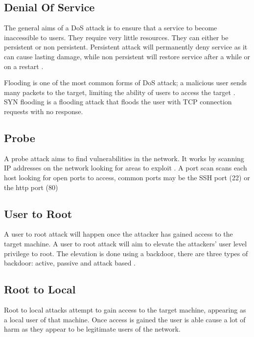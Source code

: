 \subsection{Denial Of Service}
The general aims of a DoS attack is to ensure that a service to become inaccessible to users. They require very little resources. They can either be persistent or non persistent. Persistent attack will permanently deny service as it can cause lasting damage, while non persistent will restore service after a while or on a restart \cite{anp}.

Flooding is one of the most common forms of DoS attack; a malicious user sends many packets to the target, limiting the ability of users to access the target \cite{tnstsa}. SYN flooding is a flooding attack that floods the user with TCP connection requests with no response.


\subsection{Probe}
A probe attack aims to find vulnerabilities in the network. It works by scanning IP addresses on the network looking for areas to exploit \cite{tnstsa}. A port scan scans each host looking for open ports to access, common ports may be the SSH port (22) or the http port (80)

\subsection{User to Root}
A user to root attack will happen once the attacker has gained access to the target machine. A user to root attack will aim to elevate the attackers’ user level privilege to root. The elevation is done using a backdoor, there are three types of backdoor: active, passive and attack based \cite{tnstsa}.

\subsection{Root to Local}
Root to local attacks attempt to gain access to the target machine, appearing as a local user of that machine. Once access is gained the user is able cause a lot of harm as they appear to be legitimate users of the network. 


